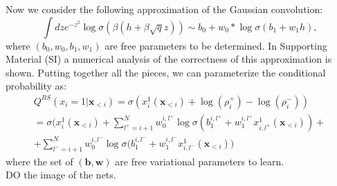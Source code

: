 Now we consider the following approximation of the Gaussian convolution:
\[
\int dz e^{-z^2}
\log \sigma \left(\beta \left(
h +\beta \sqrt{q}z \right)\right) \sim b_0 + w_0*\log \sigma(b_1 + w_1 h), 
\]
where $(b_0, w_0, b_1,w_1)$ are free parameters to be determined. In Supporting Material (SI) a numerical analysis of the correctness of this approximation is shown.  
Putting together all the pieces, we can parameterize the conditional probability as:
\begin{multline}
Q^{RS}\left(x_{i}=1|\mathbf{x}_{<i}\right) = \sigma\left( 
    x_i^1(\mathbf{x}_{<i}) +\log(\rho_i^+) - \log(\rho_i^-)
\right) \\
 = \sigma \bigg( x_i^1(\mathbf{x}_{<i}) + \sum_{l^+=i+1}^{N}  w_0^{i,l^+} \log\sigma(b_1^{i,l^+} +
 w_1^{i,l^+} x_{i,l^+}^1(\mathbf{x}_{<i}))+ \\
 + \sum_{l^-=i+1}^{N}  w_0^{i,l^-} \log\sigma(b_1^{i,l^-} + w_1^{i,l^-} x_{i,l^-}^1(\mathbf{x}_{<i})
 \bigg) 
\end{multline}
where the set of $(\mathbf{b},\mathbf{w})$ are free variational parameters to learn. 
\\DO the image of the nets.


